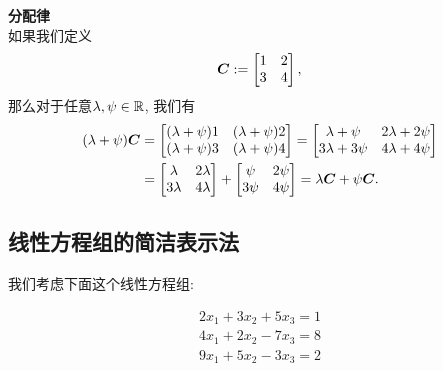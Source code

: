 \begin{example}
    \textbf{分配律}\\
    如果我们定义
    \begin{equation}
        \boldsymbol{C} :=
        \begin{bmatrix}
            1 & 2 \\
            3 & 4
        \end{bmatrix},
    \end{equation}
    那么对于任意$\lambda, \psi \in \mathbb{R}$, 我们有
    \begin{subequations}
        \begin{align}
            (\lambda + \psi) \boldsymbol{C} &=
            \begin{bmatrix}
                (\lambda + \psi)1 & (\lambda + \psi)2 \\
                (\lambda + \psi)3 & (\lambda + \psi)4
            \end{bmatrix}
            =
            \begin{bmatrix}
                \lambda + \psi & 2\lambda + 2\psi \\
                3\lambda + 3\psi & 4\lambda + 4\psi
            \end{bmatrix}
            \\&=
            \begin{bmatrix}
                \lambda & 2\lambda \\
                3\lambda & 4\lambda
            \end{bmatrix}
            +
            \begin{bmatrix}
                \psi & 2\psi \\
                3\psi & 4\psi
            \end{bmatrix}
            =
            \lambda\boldsymbol{C} + \psi \boldsymbol{C}.
        \end{align}
    \end{subequations}
\end{example}

\subsection{线性方程组的简洁表示法}

我们考虑下面这个线性方程组:

\begin{equation}
    \begin{aligned}
        2x_1 + 3x_2 + 5x_3 = 1 \\
        4x_1 + 2x_2 - 7x_3 = 8 \\
        9x_1 + 5x_2 - 3x_3 = 2 \\
    \end{aligned}
\end{equation}


